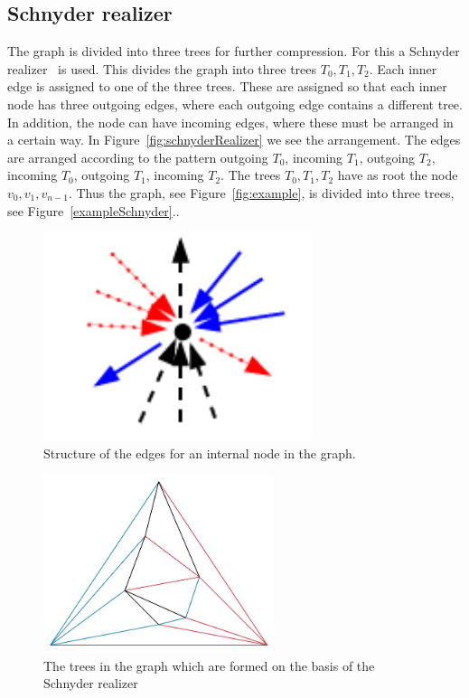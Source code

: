 \documentclass[a4paper]{scrartcl}
\begin{document}
\subsection{Schnyder realizer}
The graph is divided into three trees for further compression. For this a Schnyder realizer~\cite{schnyder} is used. This divides the graph into three trees $T_0,T_1,T_2$. Each inner edge is assigned to one of the three trees. These are assigned so that each inner node has three outgoing edges, where each outgoing edge contains a different tree.  In addition, the node can have incoming edges, where these must be arranged in a certain way. In Figure~\ref{fig:schnyderRealizer} we see the arrangement. The edges are arranged according to the pattern outgoing $T_0$, incoming $T_1$, outgoing $T_2$, incoming $T_0$, outgoing $T_1$, incoming $T_2$. The trees $T_0,T_1,T_2$ have as root the node $v_0,v_1,v_{n-1}$.
Thus the graph, see Figure~\ref{fig:example}, is divided into three trees, see Figure~\ref{exampleSchnyder}..
\begin{figure}[h]
	\centering
	\includegraphics[width=0.7\textwidth]{img/schnyderRealizer}
	\caption{Structure of the edges for an internal node in the graph. }
	\label{fig:schnyderrealizer}
\end{figure}



\begin{figure}[h]
	\centering
	\includegraphics[width=0.6\textwidth]{img/exampleSchnyder}
	\caption{The trees in the graph which are formed on the basis of the Schnyder realizer}
	\label{fig:exampleSchnyder}
\end{figure}
\end{document}
